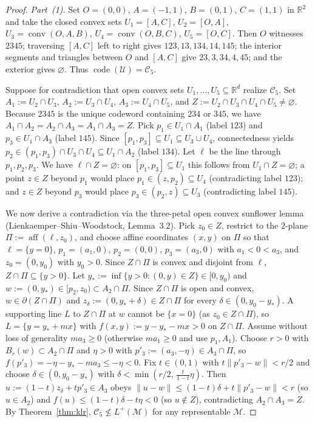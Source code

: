 \documentclass[11pt]{article}
\theoremstyle{plain}
\theoremstyle{definition}
\theoremstyle{remark}
\DeclareMathOperator{\code}{code}
\DeclareMathOperator{\conv}{conv}
\DeclareMathOperator{\aff}{aff}
\begin{document}
\begin{proof}
\emph{Part~(1).} Set $O = (0,0)$, $A = (-1,1)$, $B = (0,1)$, $C = (1,1)$ in $\mathbb{R}^2$ and take the closed convex sets $U_1 = [A, C]$, $U_2 = [O, A]$, $U_3 = \conv(O, A, B)$, $U_4 = \conv(O, B, C)$, $U_5 = [O, C]$. Then $O$ witnesses $2345$; traversing $[A, C]$ left to right gives $123, 13, 134, 14, 145$; the interior segments and triangles between $O$ and $[A, C]$ give $23, 3, 34, 4, 45$; and the exterior gives $\varnothing$. Thus $\code(\mathcal{U}) = \mathcal{C}_5$.

Suppose for contradiction that open convex sets $U_1, \dots, U_5 \subseteq \mathbb{R}^d$ realize $\mathcal{C}_5$. Set $A_1 := U_2 \cap U_3$, $A_2 := U_3 \cap U_4$, $A_3 := U_4 \cap U_5$, and $Z := U_2 \cap U_3 \cap U_4 \cap U_5 \neq \varnothing$. Because $2345$ is the unique codeword containing $234$ or $345$, we have $A_1 \cap A_2 = A_2 \cap A_3 = A_1 \cap A_3 = Z$. Pick $p_1 \in U_1 \cap A_1$ (label $123$) and $p_3 \in U_1 \cap A_3$ (label $145$). Since $[p_1, p_3] \subseteq U_1 \subseteq U_3 \cup U_4$, connectedness yields $p_2 \in (p_1, p_3) \cap U_3 \cap U_4 \subseteq U_1 \cap A_2$ (label $134$). Let $\ell$ be the line through $p_1, p_2, p_3$. We have $\ell \cap Z = \varnothing$: on $[p_1, p_3] \subseteq U_1$ this follows from $U_1 \cap Z = \varnothing$; a point $z \in Z$ beyond $p_1$ would place $p_1 \in (z, p_2) \subseteq U_4$ (contradicting label $123$); and $z \in Z$ beyond $p_3$ would place $p_3 \in (p_2, z) \subseteq U_3$ (contradicting label $145$).

We now derive a contradiction via the three-petal open convex sunflower lemma (Lienkaemper--Shiu--Woodstock, Lemma~3.2). Pick $z_0 \in Z$, restrict to the $2$-plane $\Pi := \aff(\ell, z_0)$, and choose affine coordinates $(x, y)$ on $\Pi$ so that $\ell = \{y = 0\}$, $p_1 = (a_1, 0)$, $p_2 = (0, 0)$, $p_3 = (a_3, 0)$ with $a_1 < 0 < a_3$, and $z_0 = (0, y_0)$ with $y_0 > 0$. Since $Z \cap \Pi$ is convex and disjoint from $\ell$, $Z \cap \Pi \subseteq \{y > 0\}$. Let $y_* := \inf\{y > 0 : (0, y) \in Z\} \in [0, y_0)$ and $w := (0, y_*) \in [p_2, z_0) \subset A_2 \cap \Pi$. Since $Z \cap \Pi$ is open and convex, $w \in \partial(Z \cap \Pi)$ and $z_\delta := (0, y_* + \delta) \in Z \cap \Pi$ for every $\delta \in (0, y_0 - y_*)$. A supporting line $L$ to $Z \cap \Pi$ at $w$ cannot be $\{x = 0\}$ (as $z_0 \in Z \cap \Pi$), so $L = \{y = y_* + mx\}$ with $f(x, y) := y - y_* - mx > 0$ on $Z \cap \Pi$. Assume without loss of generality $m a_3 \ge 0$ (otherwise $m a_1 \ge 0$ and use $p_1, A_1$). Choose $r > 0$ with $B_r(w) \subset A_2 \cap \Pi$ and $\eta > 0$ with $p'_3 := (a_3, -\eta) \in A_3 \cap \Pi$, so $f(p'_3) = -\eta - y_* - ma_3 \le -\eta < 0$. Fix $t \in (0, 1)$ with $t\|p'_3 - w\| < r/2$ and choose $\delta \in (0, y_0 - y_*)$ with $\delta < \min(r/2,\, \frac{t}{1-t}\eta)$. Then $u := (1 - t)z_\delta + t p'_3 \in A_3$ obeys $\|u - w\| \le (1-t)\delta + t\|p'_3 - w\| < r$ (so $u \in A_2$) and $f(u) \le (1-t)\delta - t\eta < 0$ (so $u \notin Z$), contradicting $A_2 \cap A_3 = Z$. By Theorem~\ref{thm:klr}, $\mathcal{C}_5 \not\le L^+(\mathcal{M})$ for any representable $\mathcal{M}$.


\end{proof}
\end{document}
